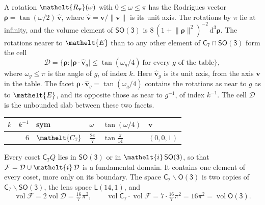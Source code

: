 \documentclass[10pt,a4paper]{article}
\numberwithin{equation}{section}
\newcommand{\eltfont}[1]{{\let\sigma\eltsigma\mathelt{#1}}}
\newcommand{\grp}[1]{\mathsf{#1}}
\newcommand{\cls}[1]{\eltfont{#1}}
\newcommand{\elt}[1]{\eltfont{#1}}
\newcommand{\dirvec}[3]{(#1, #2, #3)}
\newcommand{\unitaxis}{\hat{\mathbf{v}}}
\newcommand{\vv}{\mathbf{v}}
\newcommand{\diff}{\mathrm{d}}
\newcommand{\vol}{\operatorname{vol}}
\newcommand{\rodrigues}{\boldsymbol{\rho}}
\newcommand{\fcell}{\mathcal{D}}
\newcommand{\fdomain}{\mathcal{F}}
\newcommand{\lensspace}[2]{\mathsf{L}(#1, #2)}
\begin{document}
\leavevmode\label{n:vector.rodrigues}\label{n:vector.unitaxis}A rotation $\elt{R_{\vv}}(\omega)$ with $0 \le \omega \le \pi$ has the Rodrigues vector $\rodrigues = \tan(\omega/2)\,\unitaxis$, where $\unitaxis = \vv/\lVert\vv\rVert$ is its unit axis. The rotations by $\pi$ lie at infinity, and the volume element of \href{SO3.pdf}{$\grp{SO(3)}$} is $8\,(1 + \lVert\rodrigues\rVert^2)^{-2}\,\diff^3\rodrigues$.
\leavevmode\label{n:set.cell}The rotations nearer to $\elt{E}$ than to any other element of $\grp{C_{7}} \cap \grp{SO(3)}$ form the cell
\begin{equation}\label{e:cell}\fcell = \bigl\{\rodrigues : \lvert\rodrigues\cdot\unitaxis_g\rvert \le \tan(\omega_g/4)\ \text{for every $g$ of the table}\bigr\},\end{equation}
where $\omega_g \le \pi$ is the angle of $g$, of index $k$. Here $\unitaxis_g$ is its unit axis, from the axis $\vv$ in the table. The facet $\rodrigues\cdot\unitaxis_g = \tan(\omega_g/4)$ contains the rotations as near to $g$ as to $\elt{E}$, and its opposite those as near to $g^{-1}$, of index $k^{-1}$. The cell $\fcell$ is the unbounded slab between these two facets.
{\small{\renewcommand{\arraystretch}{1.3}\begin{longtable}{@{}rrllll@{}}\toprule
$k$ & $k^{-1}$ & sym & $\omega$ & $\tan(\omega/4)$ & $\vv$\\\midrule\endhead
\bottomrule\endfoot\endlastfoot
1 & 6 & $\cls{C_{7}}$ & $\tfrac{2\pi}{7}$ & $\tan\tfrac{\pi}{14}$ & $\dirvec{0}{0}{1}$\\
\bottomrule\end{longtable}}}

\leavevmode\label{n:set.fundamental}Every coset $\grp{C_{7}}Q$ lies in \href{SO3.pdf}{$\grp{SO(3)}$} or in $\elt{i}\,\grp{SO(3)}$, so that $\fdomain = \fcell \cup \elt{i}\,\fcell$ is a fundamental domain. It contains one element of every coset, more only on its boundary.
\leavevmode\label{n:set.lens}The space $\grp{C_{7}}\backslash\grp{O(3)}$ is two copies of $\grp{C_{7}}\backslash\grp{SO(3)}$, the lens space $\lensspace{14}{1}$, and
\begin{equation}\label{e:volume}\vol\fdomain = 2\vol\fcell = \tfrac{16}{7}\pi^2,\qquad \vol\grp{C_{7}}\cdot\vol\fdomain = 7\cdot \tfrac{16}{7}\pi^2 = 16\pi^2 = \vol\grp{O(3)}.\end{equation}
\end{document}
